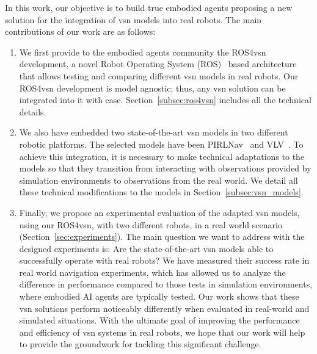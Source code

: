 In this work, our objective is to build true embodied agents proposing a new solution for the integration of \acrshort{vsn} models into real robots.
The main contributions of our work are as follows:
\begin{enumerate}
 \item We first provide to the embodied agents community the ROS4\acrshort{vsn} development, a novel Robot Operating System (ROS)~\cite{ros} based architecture that allows testing and comparing different \acrshort{vsn} models in real robots.
 Our ROS4\acrshort{vsn} development is model agnostic; thus, any \acrshort{vsn} solution can be integrated into it with ease.
 Section~\ref{subsec:ros4vsn} includes all the technical details.
 \item We also have embedded two state-of-the-art \acrshort{vsn} models in two different robotic platforms.
 The selected models have been PIRLNav~\cite{ramrakhya2023} and VLV~\cite{chang2020}.
 To achieve this integration, it is necessary to make technical adaptations to the models so that they transition from interacting with observations provided by simulation environments to observations from the real world.
 We detail all these technical modifications to the models in Section~\ref{subsec:vsn_models}.
 \item Finally, we propose an experimental evaluation of the adapted \acrshort{vsn} models, using our ROS4\acrshort{vsn}, with two different robots, in a real world scenario (Section~\ref{sec:experiments}).
 The main question we want to address with the designed experiments is: Are the state-of-the-art \acrshort{vsn} models able to successfully operate with real robots?
 We have measured their success rate in real world navigation experiments, which has allowed us to analyze the difference in performance compared to those tests in simulation environments, where embodied AI agents are typically tested.
 Our work shows that these \acrshort{vsn} solutions perform noticeably differently when evaluated in real-world and simulated situations.
 With the ultimate goal of improving the performance and efficiency of \acrshort{vsn} systems in real robots, we hope that our work will help to provide the groundwork for tackling this significant challenge.
\end{enumerate}


